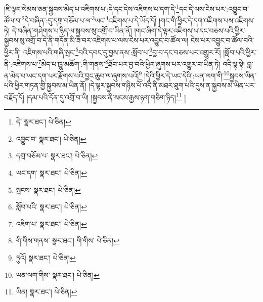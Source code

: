 །ཇི་ལྟར་སེམས་ཅན་སྐྱབས་མེད་པ་འཇིགས་པ་:དེ་དང་དེས་འཇིགས་པ་དག་དེ་\footnote{དེ་  སྣར་ཐང་།  པེ་ཅིན། }དང་དེ་ལས་ངེས་པར་:འབྱུང་བ་ཚོལ་བ་\footnote{འབྱུང་བ་  སྣར་ཐང་།  པེ་ཅིན། }དེ་བཞིན་:དུ་དགྲ་བཅོམ་པ་ལ་\footnote{དགྲ་བཅོམ་པ་  སྣར་ཐང་།  པེ་ཅིན། }ཡང་\footnote{ཡང་དག་  སྣར་ཐང་།  པེ་ཅིན། }འཇིགས་པ་དེ་ཡོད་དོ། །གང་གི་ཕྱིར་དེ་དག་འཇིགས་པས་འཇིགས་ཏེ། དེ་བཞིན་གཤེགས་པ་ཉིད་ལ་སྐྱབས་སུ་འགྲོ་བ་ཡིན་ནོ། །གང་ཞིག་དེ་ལྟར་འཇིགས་པ་དང་བཅས་པའི་ཕྱིར་སྐྱབས་སུ་འགྲོ་བ་དེ་ནི་གདོན་མི་ཟ་བར་འཇིགས་པ་ལས་ངེས་པར་འབྱུང་བ་ཚོལ་ལ། ངེས་པར་འབྱུང་བ་ཚོལ་བའི་ཕྱིར་ནི། འཇིགས་པའི་གཞི་སྤང་\footnote{སྤངས་  སྣར་ཐང་།  པེ་ཅིན། }བའི་དབང་དུ་བྱས་ནས་:སློབ་པ་\footnote{སློབ་པའི་  སྣར་ཐང་།  པེ་ཅིན། }བྱ་བ་དང་བཅས་པར་འགྱུར་རོ། །སློབ་པའི་ཕྱིར་ནི་:འཇིགས་པ་\footnote{འཇིག་པ་  སྣར་ཐང་།  པེ་ཅིན། }མེད་པ་ཁྱུ་མཆོག་:གི་གནས་\footnote{གི་གིས་གནས་  སྣར་ཐང་། གི་གིས་  པེ་ཅིན། }ཐོབ་པར་བྱ་བའི་ཕྱིར་ཞུགས་པར་འགྱུར་བ་ཡིན་ཏེ། འདི་ལྟ་སྟེ། བླ་ན་མེད་པ་ཡང་དག་པར་རྫོགས་པའི་བྱང་ཆུབ་ལ་ཞུགས་པའོ།\footnote{ཏུའོ།  སྣར་ཐང་།  པེ་ཅིན། } །དེའི་ཕྱིར་དེ་ཡང་དེའི་:ཡན་ལག་གི་\footnote{ཡན་ལག་གིས་  སྣར་ཐང་།  པེ་ཅིན། }སྐྱབས་ཡིན་པའི་ཕྱིར་གཏན་གྱི་སྐྱབས་མ་ཡིན་ནོ། །དེ་ལྟར་སྐྱབས་གཉིས་པོ་འདི་ནི་མཐར་ཐུག་པའི་དུས་ན་སྐྱབས་མ་ཡིན་པར་བརྗོད་དོ། །དམ་པའི་དོན་དུ་འགྲོ་བ་ཡི། །སྐྱབས་ནི་སངས་རྒྱས་ཉག་གཅིག་ཉིད།\footnote{ཡིན།  སྣར་ཐང་།  པེ་ཅིན། } །

